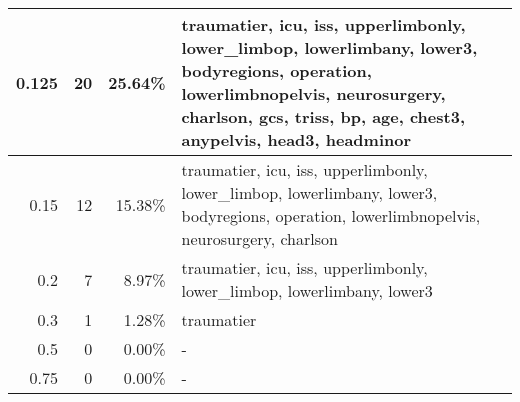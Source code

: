 \begin{table}[htbp]
{\begin{tabular}{|r|r|r|p{9.5cm}|}
0.125 & 20 & 25.64\% & traumatier, icu, iss, upperlimbonly, lower\_limbop, lowerlimbany, lower3, bodyregions, operation, lowerlimbnopelvis, neurosurgery, charlson, gcs, triss, bp, age, chest3, anypelvis, head3, headminor \\ \hline
0.15 & 12 & 15.38\% & traumatier, icu, iss, upperlimbonly, lower\_limbop, lowerlimbany, lower3, bodyregions, operation, lowerlimbnopelvis, neurosurgery, charlson \\ \hline
0.2 & 7 & 8.97\% & traumatier, icu, iss, upperlimbonly, lower\_limbop, lowerlimbany, lower3 \\ \hline
0.3 & 1 & 1.28\% & traumatier \\ \hline
0.5 & 0 & 0.00\% & - \\ \hline
0.75 & 0 & 0.00\% & - \\ \hline
\end{tabular}}
\end{table}

